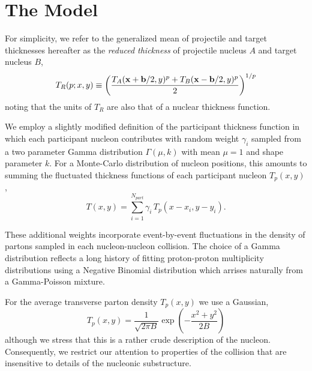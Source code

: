 \documentclass[aps,prl,reprint,amsmath,nofootinbib]{revtex4-1}
\begin{document}

\cite{constraining-ic}

\section{The Model}

For simplicity, we refer to the generalized mean of projectile and target thicknesses hereafter as the \emph{reduced thickness} of projectile nucleus $A$ and 
target nucleus $B$,
\begin{equation}
 \label{reduced}
 T_R(p;x,y) \equiv \left( \frac{T_A({\bf x}+{\bf b}/2,y)^p + T_B({\bf x}-{\bf b}/2,y)^p}{2} \right)^{1/p}
\end{equation}
noting that the units of $T_R$ are also that of a nuclear thickness function. 

We employ a slightly modified definition of the participant thickness function in which each participant nucleon contributes with random 
weight $\gamma_i$ sampled from a two parameter Gamma distribution $\Gamma(\mu,k)$ with mean $\mu=1$ and shape parameter $k$. For a Monte-Carlo distribution of nucleon 
positions, this amounts to summing the fluctuated thickness functions of each participant nucleon $T_p(x,y)$,
\begin{equation}
 \label{fluctuated thickness}
 T(x,y) = \sum\limits_{i=1}^{N_{part}} \gamma_i\, T_p(x-x_i,y-y_i).
\end{equation}

These additional weights incorporate event-by-event fluctuations in the density of partons sampled in each nucleon-nucleon collision. The choice of
a Gamma distribution reflects a long history of fitting proton-proton multiplicity distributions using a Negative Binomial distribution which arrises naturally 
from a Gamma-Poisson mixture.

For the average transverse parton density $T_p(x,y)$ we use a Gaussian,
\begin{equation}
 \label{thickness def}
 T_p(x,y) = \frac{1}{\sqrt{2 \pi B}} \exp\left(-\frac{x^2+y^2}{2 B}\right) 
\end{equation}
although we stress that this is a rather crude description of the nucleon. Consequently, we restrict our attention to properties of the collision that are insensitive to details 
of the nucleonic substructure.
\end{document}
